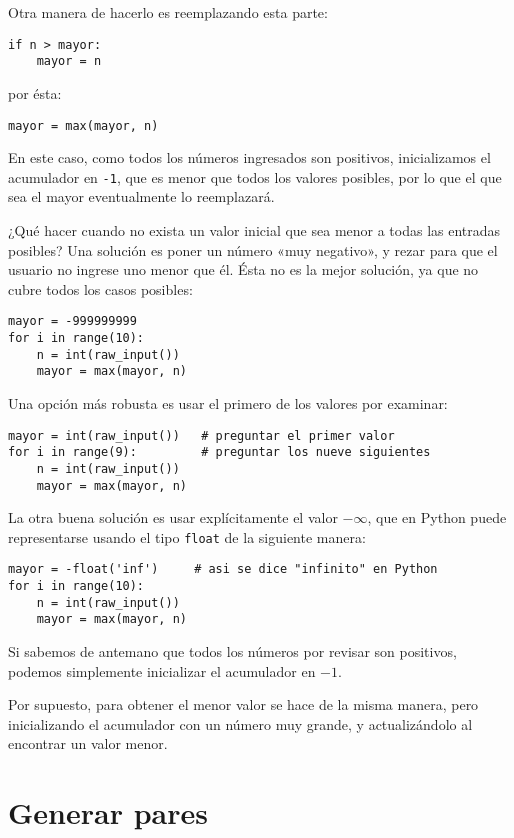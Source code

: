 Otra manera de hacerlo es reemplazando esta parte:
\begin{lstlisting}
if n > mayor:
    mayor = n
\end{lstlisting}
por ésta:
\begin{lstlisting}
mayor = max(mayor, n)
\end{lstlisting}

En este caso, como todos los números ingresados son positivos,
inicializamos el acumulador en \lstinline!-1!, que es menor que todos
los valores posibles, por lo que el que sea el mayor eventualmente lo
reemplazará.

¿Qué hacer cuando no exista un valor inicial que sea menor a todas las
entradas posibles? Una solución es poner un número «muy negativo», y
rezar para que el usuario no ingrese uno menor que él. Ésta no es la
mejor solución, ya que no cubre todos los casos posibles:

\begin{lstlisting}
mayor = -999999999
for i in range(10):
    n = int(raw_input())
    mayor = max(mayor, n)
\end{lstlisting}

Una opción más robusta es usar el primero de los valores por examinar:

\begin{lstlisting}
mayor = int(raw_input())   # preguntar el primer valor
for i in range(9):         # preguntar los nueve siguientes
    n = int(raw_input())
    mayor = max(mayor, n)
\end{lstlisting}

La otra buena solución es usar explícitamente el valor \(-\infty\), que en
Python puede representarse usando el tipo \lstinline!float! de la
siguiente manera:

\begin{lstlisting}
mayor = -float('inf')     # asi se dice "infinito" en Python
for i in range(10):
    n = int(raw_input())
    mayor = max(mayor, n)
\end{lstlisting}

Si sabemos de antemano que todos los números por revisar son positivos,
podemos simplemente inicializar el acumulador en \(-1\).

Por supuesto, para obtener el menor valor se hace de la misma manera,
pero inicializando el acumulador con un número muy grande, y
actualizándolo al encontrar un valor menor.

\section{Generar pares}

